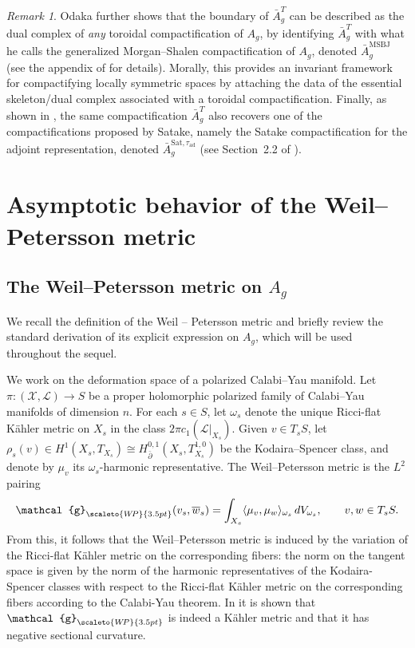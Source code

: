 \documentclass[11pt]{amsart}
\theoremstyle{plain}
\theoremstyle{definition}
\theoremstyle{remark}
\newtheorem{remark}[theorem]{Remark}
\newcommand{\X}{{\mathcal X }}
\newcommand{\g}{\mathcal{g}}
\newcommand{\WP}{\scaleto{W\!P}{3.5pt}}
\begin{document}
\begin{remark}
Odaka further shows that the boundary of $\bar A_g^{T}$ can be described as the dual complex of \emph{any}
toroidal compactification of $A_g$, by identifying $\bar A_g^{T}$ with what he calls the generalized
Morgan--Shalen compactification of $A_g$, denoted $\bar A_g^{\scriptscriptstyle\mathrm{MSBJ}}$
(see the appendix of \cite{Odaka2019} for details). Morally, this provides an invariant framework for
compactifying locally symmetric spaces by attaching the data of the essential skeleton/dual complex
associated with a toroidal compactification. Finally, as shown in \cite{OO2021}, the same compactification
$\bar A_g^{T}$ also recovers one of the compactifications proposed by Satake, namely the Satake
compactification for the adjoint representation, denoted $\bar A_g^{\mathrm{Sat},\tau_{\mathrm{ad}}}$
(see Section~2.2 of \cite{OO2021}).
\end{remark}

\section{Asymptotic behavior of the Weil--Petersson metric}
\label{sec:asymp.wpm}
\subsection{The Weil--Petersson metric on \texorpdfstring{$A_g$}.}
\label{sec:wp.Ag}
We recall the definition of the Weil – Petersson metric and briefly review the standard derivation of its explicit expression on $A_g$, which will be used throughout the sequel. 

We work on the deformation space of a polarized Calabi--Yau manifold. Let $\pi:(\X,\mathcal{L})\to S$ be a proper holomorphic polarized family of Calabi--Yau manifolds of dimension $n$. For each $s\in S$, let $\omega_s$ denote the unique Ricci-flat K\"ahler metric on $X_s$ in the class $2\pi c_1(\mathcal{L}|_{X_s})$. Given $v\in T_sS$, let $\rho_s(v)\in H^1(X_s,T_{X_s})\cong H^{0,1}_{\bar\partial}(X_s,T^{1,0}_{X_s})$ be the Kodaira--Spencer class, and denote by $\mu_v$ its $\omega_s$-harmonic representative. The Weil--Petersson metric is the $L^2$ pairing
\[
\g_{\WP}(v_s,\overline{w}_s) = \int_{X_s}\langle \mu_v,\mu_w\rangle_{\omega_s}\,dV_{\omega_s},
\qquad v,w\in T_sS.
\]
From this, it follows that the Weil--Petersson metric is induced by the variation of the Ricci-flat K\"ahler metric on the corresponding fibers: the norm on the tangent space is given by the norm of the harmonic representatives of the Kodaira-Spencer classes with respect to the Ricci-flat K\"ahler metric on the corresponding fibers according to the Calabi-Yau theorem. In \cite{Tian87,Todorov89} it is shown that $\g_{\WP}$ is indeed a K\"ahler metric and that it has negative sectional curvature.
\end{document}
